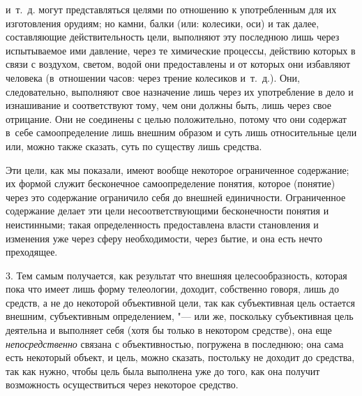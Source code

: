 и~т.~д. могут представляться целями по отношению к употребленным для их
изготовления орудиям; но камни, балки (или: колесики, оси) и так далее,
составляющие действительность цели, выполняют эту последнюю лишь через
испытываемое ими давление, через те химические процессы, действию которых в
связи с воздухом, светом, водой они предоставлены и от которых они
избавляют человека (в~отношении часов: через трение колесиков и~т.~д.).
Они, следовательно, выполняют свое назначение лишь через их употребление в
дело и изнашивание и соответствуют тому, чем они должны быть, лишь через
свое отрицание. Они не соединены с целью положительно, потому что они
содержат в~себе самоопределение лишь внешним образом и суть лишь
относительные цели или, можно также сказать, суть по существу лишь
средства.

Эти цели, как мы показали, имеют вообще некоторое ограниченное
содержание; их формой служит бесконечное самоопределение понятия, которое
(понятие) через это содержание ограничило себя до внешней единичности.
Ограниченное содержание делает эти цели несоответствующими бесконечности
понятия и неистинными; такая определенность предоставлена власти
становления и изменения уже через сферу необходимости, через бытие, и она
есть нечто преходящее.

3. Тем самым получается, как результат что внешняя
целесообразность, которая пока что имеет лишь форму телеологии, доходит,
собственно говоря, лишь до средств, а не до некоторой объективной цели, так
как субъективная цель остается внешним, субъективным определением, "---
или же, поскольку субъективная цель деятельна и выполняет
себя (хотя бы только в некотором средстве), она еще
{\em непосредственно}
связана с объективностью, погружена в последнюю; она сама
есть некоторый объект, и цель, можно сказать, постольку не доходит до
средства, так как нужно, чтобы цель была выполнена уже до того, как она
получит возможность осуществиться через некоторое средство.

